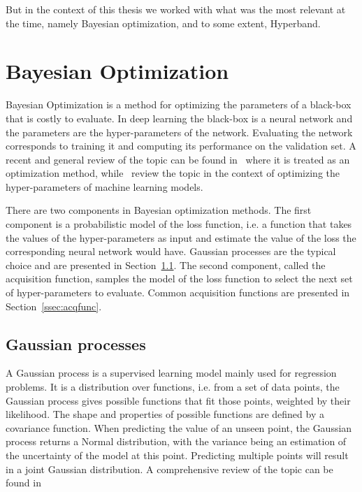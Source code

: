 But in the context of this thesis we worked with what was the most relevant at the time, namely Bayesian optimization, and to some extent, Hyperband.

\section{Bayesian Optimization}
\label{sec:bo}

Bayesian Optimization is a method for optimizing the parameters of a black-box that is costly to evaluate. In deep learning the black-box is a neural network and the parameters are the hyper-parameters of the network. Evaluating the network corresponds to training it and computing its performance on the validation set. A recent and general review of the topic can be found in~\textcite{shahriari2016IEEE} where it is treated as an optimization method, while~\textcite{snoek2012NIPS} review the topic in the context of optimizing the hyper-parameters of machine learning models.

There are two components in Bayesian optimization methods. The first component is a probabilistic model of the loss function, i.e. a function that takes the values of the hyper-parameters as input and estimate the value of the loss the corresponding neural network would have. Gaussian processes are the typical choice and are presented in Section~\ref{ssec:gp}. 
The second component, called the acquisition function, samples the model of the loss function to select the next set of hyper-parameters to evaluate. Common acquisition functions are presented in Section~\ref{ssec:acqfunc}.

\subsection{Gaussian processes}
\label{ssec:gp}

A Gaussian process is a supervised learning model mainly used for regression problems. It is a distribution over functions, i.e. from a set of data points, the Gaussian process gives possible functions that fit those points, weighted by their likelihood. The shape and properties of possible functions are defined by a covariance function. When predicting the value of an unseen point, the Gaussian process returns a Normal distribution, with the variance being an estimation of the uncertainty of the model at this point. Predicting multiple points will result in a joint Gaussian distribution. A comprehensive review of the topic can be found in~\textcite{rasmussen2005}

